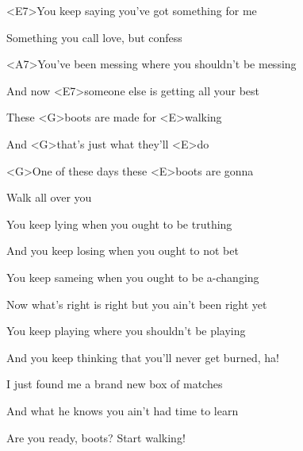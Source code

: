 

\zs
<E7>You keep saying you've got something for me

Something you call love, but confess

<A7>You've been messing where you shouldn't be messing

And now <E7>someone else is getting all your best
\ks

\zr
These <G>boots are made for <E>walking

And <G>that's just what they'll <E>do

<G>One of these days these <E>boots are gonna

Walk all over you
\kr

\zs
You keep lying when you ought to be truthing

And you keep losing when you ought to not bet

You keep sameing when you ought to be a-changing

Now what's right is right but you ain't been right yet
\ks

\zr\kr

\zs
You keep playing where you shouldn't be playing

And you keep thinking that you'll never get burned, ha!

I just found me a brand new box of matches

And what he knows you ain't had time to learn
\ks

\zr\kr

Are you ready, boots? Start walking!

\kp
